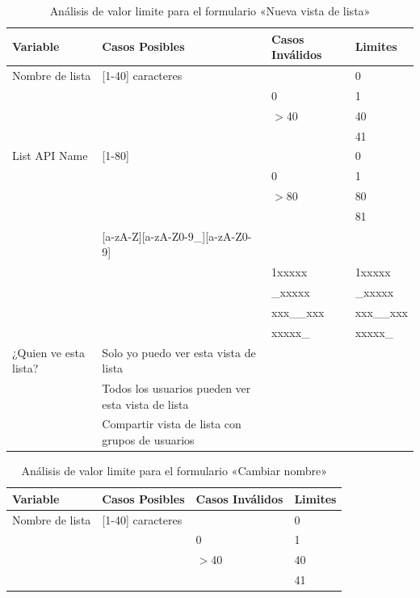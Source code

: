 \begin{table}[H]
\centering
\begin{tabular}{|p{3.0cm}|p{7.0cm}|p{3.0cm}|l|}
\hline
\footnotesize{\textbf{Variable}} & \footnotesize{\textbf{Casos Posibles}} & \footnotesize{\textbf{Casos Inválidos}} & \footnotesize{\textbf{Limites}} \\
\hline
\footnotesize{Nombre de lista} & \footnotesize{[1-40] caracteres} & & \footnotesize{0} \\
& & \footnotesize{0} & \footnotesize{1} \\
& & \footnotesize{$>$40} & \footnotesize{40} \\
& & & \footnotesize{41} \\
\hline
\footnotesize{List API Name} & \footnotesize{[1-80]} & & \footnotesize{0} \\
& & \footnotesize{0} & \footnotesize{1} \\
& & \footnotesize{$>$80} & \footnotesize{80} \\
& & & \footnotesize{81} \\
& \footnotesize{[a-zA-Z][a-zA-Z0-9\_][a-zA-Z0-9]} & & \\
& & \footnotesize{1xxxxx} & \footnotesize{1xxxxx} \\
& & \footnotesize{\_xxxxx} & \footnotesize{\_xxxxx} \\
& & \footnotesize{xxx\_\_xxx} & \footnotesize{xxx\_\_xxx} \\
& & \footnotesize{xxxxx\_} & \footnotesize{xxxxx\_} \\
\hline
\footnotesize{¿Quien ve esta lista?} & \footnotesize{Solo yo puedo ver esta vista de lista} & & \\
& \footnotesize{Todos los usuarios pueden ver esta vista de lista} & & \\
& \footnotesize{Compartir vista de lista con grupos de usuarios} & & \\
\hline
\end{tabular}
\caption{Análisis de valor limite para el formulario «Nueva vista de lista»}
\label{myers_07}
\end{table}

\begin{table}[H]
\centering
\begin{tabular}{|l|l|l|l|}
\hline
\footnotesize{\textbf{Variable}} & \footnotesize{\textbf{Casos Posibles}} & \footnotesize{\textbf{Casos Inválidos}} & \footnotesize{\textbf{Limites}} \\
\hline
\footnotesize{Nombre de lista} & \footnotesize{[1-40] caracteres} & & \footnotesize{0} \\
& & \footnotesize{0} & \footnotesize{1} \\
& & \footnotesize{$>$40} & \footnotesize{40} \\
& & & \footnotesize{41} \\
\hline
\end{tabular}
\caption{Análisis de valor limite para el formulario «Cambiar nombre»}
\label{myers_08}
\end{table}

